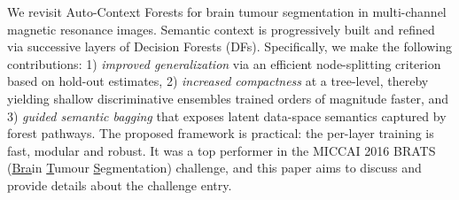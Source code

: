 
We revisit Auto-Context Forests for brain tumour segmentation in multi-channel magnetic resonance images. 
Semantic context is progressively built and refined via successive layers of Decision Forests (DFs). 
Specifically, we make the following contributions: 1) \textit{improved generalization} via an efficient 
node-splitting criterion based on hold-out estimates,
2) \textit{increased compactness} at a tree-level,
thereby yielding shallow discriminative ensembles trained orders of magnitude faster, and 3) 
\textit{guided semantic bagging} that exposes latent data-space semantics captured by forest pathways.
The proposed framework is practical: the per-layer training is fast, modular and robust. It was a top performer in the MICCAI 2016 BRATS (\uline{Bra}in \uline{T}umour \uline{S}egmentation) challenge, and this paper aims to discuss and provide details about the challenge entry.
